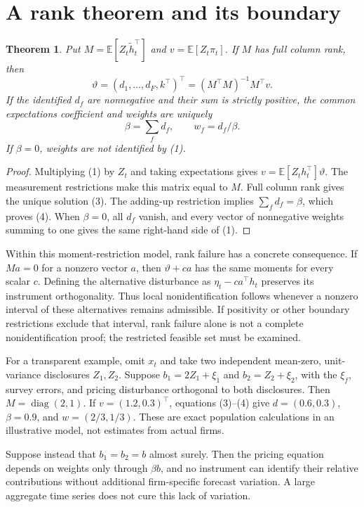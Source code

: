 \documentclass[11pt,a4paper]{article}
\newtheorem{theorem}{Theorem}[section]
\newcommand{\E}{\mathbb E}
\begin{document}
\section{A rank theorem and its boundary}
\begin{theorem}
Put $M=\E[Z_t\widetilde h_t^\top]$ and $v=\E[Z_t\pi_t]$. If $M$ has full column rank, then
\[
 \vartheta=(d_1,\ldots,d_F,k^\top)^\top
      =(M^\top M)^{-1}M^\top v.
 \tag{3}
\]
If the identified $d_f$ are nonnegative and their sum is strictly positive, the common expectations coefficient and weights are uniquely
\[
 \beta=\sum_f d_f,\qquad w_f=d_f/\beta.
 \tag{4}
\]
If $\beta=0$, weights are not identified by (1).
\end{theorem}
\begin{proof}
Multiplying (1) by $Z_t$ and taking expectations gives
$v=\E[Z_th_t^\top]\vartheta$. The measurement restrictions make this matrix equal to $M$. Full column rank gives the unique solution (3). The adding-up restriction implies $\sum_f d_f=\beta$, which proves (4). When $\beta=0$, all $d_f$ vanish, and every vector of nonnegative weights summing to one gives the same right-hand side of (1).
\end{proof}
Within this moment-restriction model, rank failure has a concrete consequence. If $Ma=0$ for a nonzero vector $a$, then $\vartheta+ca$ has the same moments for every scalar $c$. Defining the alternative disturbance as $\eta_t-ca^\top h_t$ preserves its instrument orthogonality. Thus local nonidentification follows whenever a nonzero interval of these alternatives remains admissible. If positivity or other boundary restrictions exclude that interval, rank failure alone is not a complete nonidentification proof; the restricted feasible set must be examined.

For a transparent example, omit $x_t$ and take two independent mean-zero, unit-variance disclosures $Z_1,Z_2$. Suppose $b_1=2Z_1+\xi_1$ and $b_2=Z_2+\xi_2$, with the $\xi_f$, survey errors, and pricing disturbance orthogonal to both disclosures. Then $M=\operatorname{diag}(2,1)$. If $v=(1.2,0.3)^\top$, equations (3)--(4) give $d=(0.6,0.3)$, $\beta=0.9$, and $w=(2/3,1/3)$. These are exact population calculations in an illustrative model, not estimates from actual firms.

Suppose instead that $b_1=b_2=b$ almost surely. Then the pricing equation depends on weights only through $\beta b$, and no instrument can identify their relative contributions without additional firm-specific forecast variation. A large aggregate time series does not cure this lack of variation.
\end{document}
